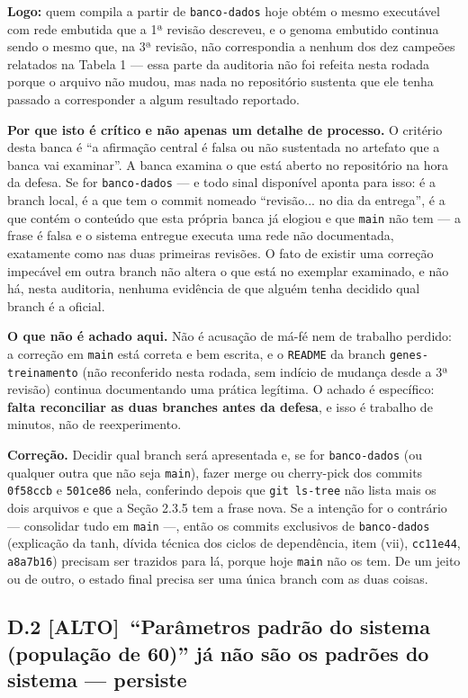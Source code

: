 \documentclass[11pt,a4paper]{article}
\newcommand{\alto}{\textbf{\color{orange!70!black}[ALTO]}}
\begin{document}
\textbf{Logo:} quem compila a partir de \texttt{banco-dados} hoje obtém o mesmo executável com rede
embutida que a 1ª revisão descreveu, e o genoma embutido continua sendo o mesmo que, na 3ª revisão,
não correspondia a nenhum dos dez campeões relatados na Tabela 1 --- essa parte da auditoria não foi
refeita nesta rodada porque o arquivo não mudou, mas nada no repositório sustenta que ele tenha
passado a corresponder a algum resultado reportado.

\textbf{Por que isto é crítico e não apenas um detalhe de processo.} O critério desta banca é
``a afirmação central é falsa ou não sustentada no artefato que a banca vai examinar''. A banca
examina o que está aberto no repositório na hora da defesa. Se for \texttt{banco-dados} --- e todo
sinal disponível aponta para isso: é a branch local, é a que tem o commit nomeado ``revisão... no dia
da entrega'', é a que contém o conteúdo que esta própria banca já elogiou e que \texttt{main} não tem
--- a frase é falsa e o sistema entregue executa uma rede não documentada, exatamente como nas duas
primeiras revisões. O fato de existir uma correção impecável em outra branch não altera o que está no
exemplar examinado, e não há, nesta auditoria, nenhuma evidência de que alguém tenha decidido qual
branch é a oficial.

\textbf{O que não é achado aqui.} Não é acusação de má-fé nem de trabalho perdido: a correção em
\texttt{main} está correta e bem escrita, e o \texttt{README} da branch \texttt{genes-treinamento}
(não reconferido nesta rodada, sem indício de mudança desde a 3ª revisão) continua documentando uma
prática legítima. O achado é específico: \textbf{falta reconciliar as duas branches antes da defesa},
e isso é trabalho de minutos, não de reexperimento.

\textbf{Correção.} Decidir qual branch será apresentada e, se for \texttt{banco-dados} (ou qualquer
outra que não seja \texttt{main}), fazer merge ou cherry-pick dos commits \texttt{0f58ccb} e
\texttt{501ce86} nela, conferindo depois que \texttt{git ls-tree} não lista mais os dois arquivos e
que a Seção 2.3.5 tem a frase nova. Se a intenção for o contrário --- consolidar tudo em
\texttt{main} ---, então os commits exclusivos de \texttt{banco-dados} (explicação da tanh, dívida
técnica dos ciclos de dependência, item (vii), \texttt{cc11e44}, \texttt{a8a7b16}) precisam ser
trazidos para lá, porque hoje \texttt{main} não os tem. De um jeito ou de outro, o estado final
precisa ser uma única branch com as duas coisas.

\subsection*{D.2 \alto\ ``Parâmetros padrão do sistema (população de 60)'' já não são os padrões do
sistema --- persiste}
\end{document}
